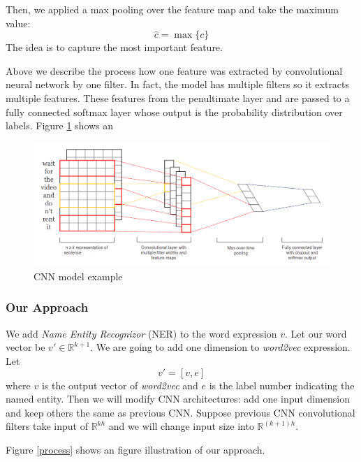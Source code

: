 \documentclass[10pt,twocolumn,letterpaper]{article}
\begin{document}
Then, we applied a max pooling over the feature map and take the maximum value:
$$\hat{c} = \max \{c\}$$
The idea is to capture the most important feature.

Above we describe the process how one feature was extracted by convolutional neural network by one filter. In fact, the model has multiple filters so it extracts multiple features. These features from the penultimate layer and are passed to a fully connected softmax layer whose output is the probability distribution over labels. Figure \ref{cnn} shows an

\begin{figure}
  \includegraphics[width=\linewidth]{cnn.png}
  \caption{CNN model example}
  \label{cnn}
\end{figure}


\subsubsection{Our Approach}
We add \textit{Name Entity Recognizor} (NER) to the word expression $v$. Let our word vector be $v' \in \mathbb{R}^{k+1}$. We are going to add one dimension to \textit{word2vec} expression. Let
$$v' = [v, e]$$
where $v$ is the output vector of \textit{word2vec} and $e$ is the label number indicating the named entity. Then we will modify CNN architectures: add one input dimension and keep others the same as previous CNN. Suppose previous CNN convolutional filters take input of $\mathbb{R}^{kh}$ and we will change input size into $\mathbb{R}^{(k+1)h}$. 

Figure \ref{process} shows an figure illustration of our approach.
 
\end{document}

